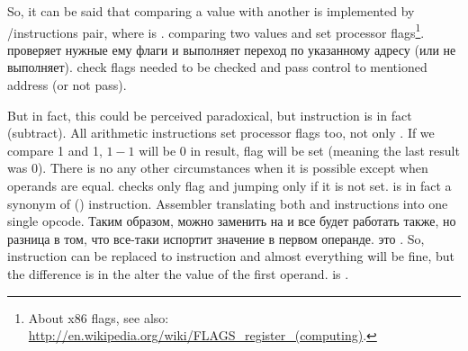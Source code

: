 {So, it can be said that comparing a value with another is  implemented
by \CMP/\Jcc instructions pair, where  is .}
{\CMP comparing two values and set 
processor flags\footnote{About x86 flags, see also: \url{http://en.wikipedia.org/wiki/FLAGS_register_(computing)}.}.}
\IFRU
{\Jcc проверяет нужные ему флаги и выполняет переход по указанному адресу (или не выполняет).}
{\Jcc check flags needed to be checked and pass control to mentioned address (or not pass).}

\label{CMPandSUB}
{But in fact, this could be perceived paradoxical, but \CMP instruction is in fact \SUB (subtract).}
{All arithmetic instructions set processor flags too, not only \CMP.}
{If we compare 1 and 1, $1-1$ will be $0$ in result, \ZF flag will be set (meaning the last result was $0$).}
{There is no any other circumstances when it is possible except when operands are equal.}
{\JNE checks only \ZF flag and jumping only if it is not set. 
\JNE is in fact a synonym of \JNZ () instruction.}
{Assembler translating both \JNE and \JNZ instructions into one single opcode.}
\IFRU
{Таким образом, можно \CMP заменить на \SUB и все будет работать также, но разница в том, что \SUB 
все-таки испортит значение в первом операнде. \CMP это .}
{So, \CMP instruction can be replaced to \SUB instruction and almost everything will be fine,
but the difference is in 
the \SUB alter the value of the first operand.
\CMP is .}

